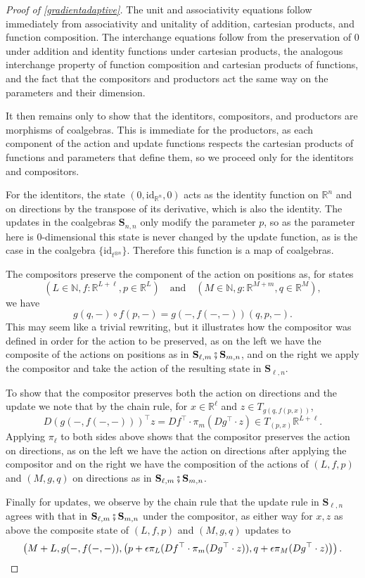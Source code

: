 \documentclass{eptcs}
\theoremstyle{definition}
\theoremstyle{plain}
\newcommand{\Cat}[1]{\textbf{#1}}%
\newcommand{\id}{\mathrm{id}}
\newcommand{\then}{\mathbin{\fatsemi}}
\newcommand{\nn}{\mathbb{N}}
\newcommand{\rr}{\mathbb{R}}
\newcommand{\0}{\textsf{0}}
\newcommand{\1}{\tn{\textsf{1}}}
\renewcommand{\S}{{\Cat{S}}}
\newcommand{\idcoalg}[1]{{\{\id_{#1}\}}}
\begin{document}
\begin{proof}[Proof of \cref{gradientadaptive}]
The unit and associativity equations follow immediately from associativity and unitality of addition, cartesian products, and function composition. The interchange equations follow from the preservation of 0 under addition and identity functions under cartesian products, the analogous interchange property of function composition and cartesian products of functions, and the fact that the compositors and productors act the same way on the parameters and their dimension. 

It then remains only to show that the identitors, compositors, and productors are morphisms of coalgebras. This is immediate for the productors, as each component of the action and update functions respects the cartesian products of functions and parameters that define them, so we proceed only for the identitors and compositors.

For the identitors, the state $(0,\id_{\rr^n},0)$ acts as the identity function on $\rr^n$ and on directions by the transpose of its derivative, which is also the identity. The updates in the coalgebras $\S_{n,n}$ only modify the parameter $p$, so as the parameter here is 0-dimensional this state is never changed by the update function, as is the case in the coalgebra $\idcoalg{t^{\otimes n}}$. Therefore this function is a map of coalgebras.

The compositors preserve the component of the action on positions as, for states 
\[(L \in \nn, f\colon \rr^{L+\ell}, p \in \rr^L) \quad \textrm{and} \quad (M \in \nn, g\colon \rr^{M+m}, q \in \rr^M),\]
we have 
\[g(q,-) \circ f(p,-) = g(-,f(-,-))(q,p,-).\]
This may seem like a trivial rewriting, but it illustrates how the compositor was defined in order for the action to be preserved, as on the left we have the composite of the actions on positions as in $\S_{\ell,m}\then\S_{m,n}$, and on the right we apply the compositor and take the action of the resulting state in $\S_{\ell,n}$.

To show that the compositor preserves both the action on directions and the update we note that by the chain rule, for $x \in \rr^\ell$ and $z \in T_{g(q,f(p,x))}$,
\[D\left( g(-,f(-,-)) \right)^\top z = Df^\top \cdot \pi_m(Dg^\top \cdot z) \in T_{(p,x)}\rr^{L+\ell}.\]
Applying $\pi_\ell$ to both sides above shows that the compositor preserves the action on directions, as on the left we have the action on directions after applying the compositor and on the right we have the composition of the actions of $(L,f,p)$ and $(M,g,q)$ on directions as in $\S_{\ell,m}\then\S_{m,n}$.

Finally for updates, we observe by the chain rule that the update rule in $\S_{\ell,n}$ agrees with that in $\S_{\ell,m}\then\S_{m,n}$ under the compositor, as either way for $x,z$ as above the composite state of $(L,f,p)$ and $(M,g,q)$ updates to 
\[\left( M+L,g(-,f(-,-)),\left( p + \epsilon \pi_L (Df^\top \cdot \pi_m(Dg^\top \cdot z)),q + \epsilon \pi_M(Dg^\top \cdot z) \right) \right).\qedhere\]
\end{proof}





\end{document}

